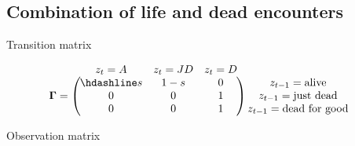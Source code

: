 \documentclass[
  12pt,
]{krantz}
\begin{document}
\hypertarget{combination-of-life-and-dead-encounters}{%
\subsection{Combination of life and dead encounters}\label{combination-of-life-and-dead-encounters}}

Transition matrix

\[
\begin{matrix}
& \\
\mathbf{\Gamma} =
    \left ( \vphantom{ \begin{matrix} 12 \\ 12 \\ 12 \end{matrix} } \right .
\end{matrix}
\hspace{-1.2em}
\begin{matrix}
    z_t=A & z_t=JD & z_t=D \\ \hdashline
s & 1-s & 0\\
0 & 0 & 1\\
0 & 0 & 1
\end{matrix}
\hspace{-0.2em}
\begin{matrix}
& \\
\left . \vphantom{ \begin{matrix} 12 \\ 12 \\ 12 \end{matrix} } \right )
    \begin{matrix}
    z_{t-1}=\text{alive} \\ z_{t-1}=\text{just dead} \\ z_{t-1}=\text{dead for good}
    \end{matrix}
\end{matrix}
\]

Observation matrix
\end{document}
